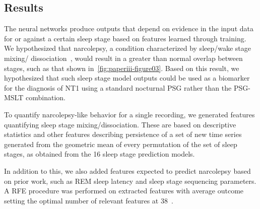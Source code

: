 \subsection{Results}

The neural networks produce outputs that depend on evidence in the input data for or against a certain sleep stage based on features learned through training.
We hypothesized that narcolepsy, a condition characterized by sleep/wake stage mixing/ dissociation~\cite{Christensen2015a,Olsen2017,Jensen2014,Vassalli2013,Pizza2015}, would result in a greater than normal overlap between stages, such as that shown in~\cref{fig:paperiii-figure03}.
Based on this result, we hypothesized that such sleep stage model outputs could be used as a biomarker for the diagnosis of \ac{NT1} using a standard nocturnal \ac{PSG} rather than the \ac{PSG}-\ac{MSLT} combination.

To quantify narcolepsy-like behavior for a single recording, we generated features quantifying sleep stage mixing/dissociation. 
These are based on descriptive statistics and other features describing persistence of a set of new time series generated from the geometric mean of every permutation of the set of sleep stages, as obtained from the 16 sleep stage prediction models.

In addition to this, we also added features expected to predict narcolepsy based on prior work, such as \ac{REM} sleep latency and sleep stage sequencing parameters. 
A \ac{RFE} procedure was performed on extracted features with average outcome setting the optimal number of relevant features at 38~\cite{Guyon2002}. 

